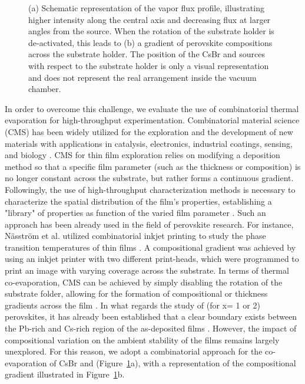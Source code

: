\begin{figure}[htbp]
    \caption{(a) Schematic representation of the vapor flux profile, illustrating higher intensity along the central axis and decreasing flux at larger angles from the source. When the rotation of the substrate holder is de-activated, this leads to (b) a gradient of perovskite compositions across the substrate holder. The position of the CsBr and  sources with respect to the substrate holder is only a visual representation and does not represent the real arrangement inside the vacuum chamber.}   
    \label{fig:stability:combinatorial_approach}
\end{figure}


In order to overcome this challenge, we evaluate the use of combinatorial thermal evaporation for high-throughput experimentation. Combinatorial material science (CMS) has been widely utilized for the exploration and the development of new materials with applications in catalysis, electronics, industrial coatings, sensing, and biology \cite{Potyrailo2011CombinatorialArt}. CMS for thin film exploration relies on modifying a deposition method so that a specific film parameter (such as the thickness or composition) is no longer constant across the substrate, but rather forms a continuous gradient. Followingly, the use of high-throughput characterization methods is necessary to characterize the spatial distribution of the film's properties, establishing a "library" of properties as function of the varied film parameter \cite{McGinn2019Thin-filmReview, Xiang1999CombinatorialMaterials, Ludwig2019DiscoveryMethods}. Such an approach has been already used in the field of perovskite research. For instance, Näsström et al. utilized combinatorial inkjet printing to study the phase transition temperatures of  thin films \cite{Nasstrom2020DependenceExperimentation}. A compositional gradient was achieved by using an inkjet printer with two different print-heads, which were programmed to print an image with varying coverage across the substrate. In terms of thermal co-evaporation, CMS can be achieved by simply disabling the rotation of the substrate folder, allowing for the formation of compositional or thickness gradients across the film  \cite{Becker2019LowExperimentation, Susic2023CombinatorialCells, Lin2024FormationTreatment, Huang2021Vapor-deposited16, Li2019High-ThroughputDeposition}. In what regards the study of   (for x= 1 or 2) perovskites, it has already been established that a clear boundary exists between the Pb-rich and Cs-rich region of the as-deposited films \cite{Becker2019LowExperimentation, Huang2021Vapor-deposited16, Lin2024FormationTreatment}. However, the impact of compositional variation on the ambient stability of the films remains largely unexplored. For this reason, we adopt a combinatorial approach for the co-evaporation of CsBr and  (Figure~\ref{fig:stability:combinatorial_approach}a), with a representation of the compositional gradient illustrated in Figure~\ref{fig:stability:combinatorial_approach}b.


